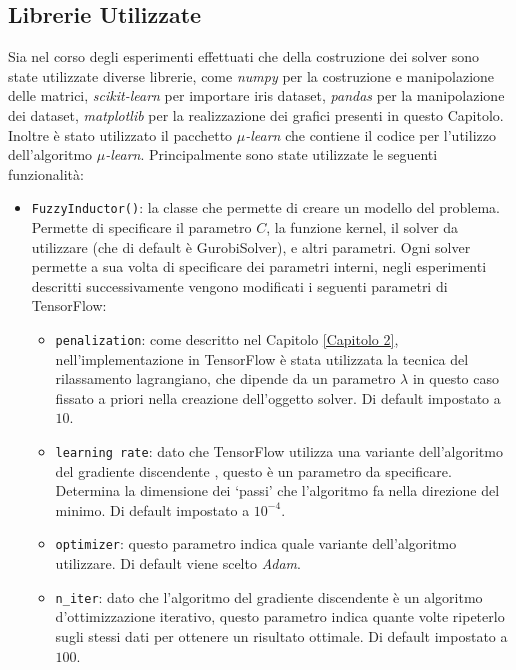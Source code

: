 \documentclass[a4paper,12pt]{report}
\begin{document}
\subsection*{Librerie Utilizzate}
Sia nel corso degli esperimenti effettuati che della costruzione dei solver sono state utilizzate diverse librerie, come \textit{numpy} \cite{NumPy} per la costruzione e manipolazione delle matrici, \textit{scikit-learn} \cite{scikit-learn} per importare iris dataset, \textit{pandas} \cite{pandas} per la manipolazione dei dataset, \textit{matplotlib} \cite{matplotlib} per la realizzazione dei grafici presenti in questo Capitolo. Inoltre è stato utilizzato il pacchetto \textit{$\mu$-learn} \cite{mulearn_documentation} che contiene il codice per l'utilizzo dell'algoritmo \textit{$\mu$-learn}. Principalmente sono state utilizzate le seguenti funzionalità:
\begin{itemize}
    \item \texttt{FuzzyInductor()}: la classe che permette di creare un modello del problema. Permette di specificare il parametro $C$, la funzione kernel, il solver da utilizzare (che di default è GurobiSolver), e altri parametri. Ogni solver permette a sua volta di specificare dei parametri interni, negli esperimenti descritti successivamente vengono modificati i seguenti parametri di TensorFlow:
    \begin{itemize}
        \item \texttt{penalization}: come descritto nel Capitolo \ref{Capitolo 2}, nell'implementazione in TensorFlow è stata utilizzata la tecnica del rilassamento lagrangiano, che dipende da un parametro $\lambda$ in questo caso fissato a priori nella creazione dell'oggetto solver. Di default impostato a $10$.
        \item \texttt{learning rate}: dato che TensorFlow utilizza una variante dell'algoritmo del gradiente discendente \cite{gradient_descent}, questo è un parametro da specificare. Determina la dimensione dei `passi' che l'algoritmo fa nella direzione del minimo. Di default impostato a $10^{-4}$.
        \item \texttt{optimizer}: questo parametro indica quale variante dell'algoritmo utilizzare. Di default viene scelto \textit{Adam}.
        \item \texttt{n\_iter}: dato che l'algoritmo del gradiente discendente è un algoritmo d'ottimizzazione iterativo, questo parametro indica quante volte ripeterlo sugli stessi dati per ottenere un risultato ottimale. Di default impostato a $100$.
    \end{itemize}

\end{itemize}
\end{document}
